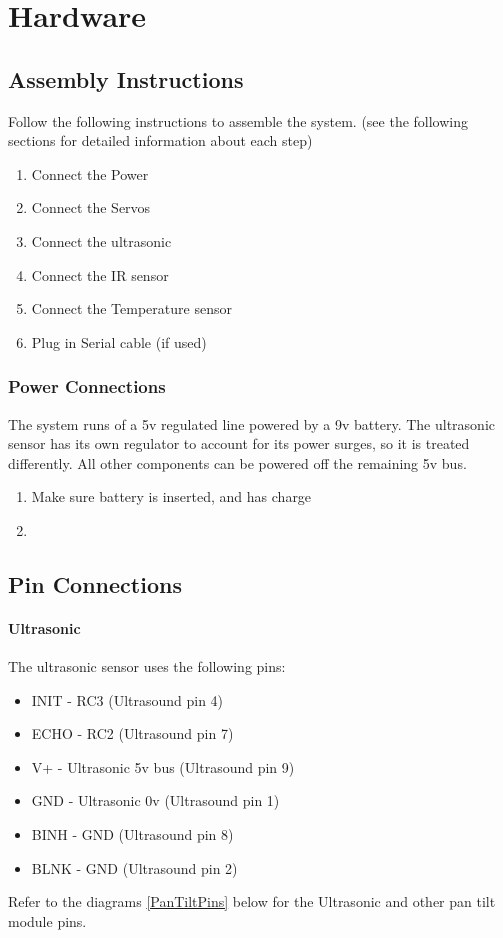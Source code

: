 \documentclass[]{report}
\begin{document}
\part{Hardware}
\chapter{Assembly Instructions}
Follow the following instructions to assemble the system. (see the following sections for detailed information about each step)

\begin{enumerate}
	\item Connect the Power
	\item Connect the Servos
	\item Connect the ultrasonic
	\item Connect the IR sensor
	\item Connect the Temperature sensor
	\item Plug in Serial cable (if used)
\end{enumerate}

\section{Power Connections}
The system runs of a 5v regulated line powered by a 9v battery. The ultrasonic sensor has its own regulator to account for its power surges, so it is treated differently. All other components can be powered off the remaining 5v bus.

\begin{enumerate}
	\item Make sure battery is inserted, and has charge
	\item 
\end{enumerate}

\chapter{Pin Connections}
\subsection{Ultrasonic}
The ultrasonic sensor uses the following pins: 
\begin{itemize}
	\item INIT - RC3 (Ultrasound pin 4)
	\item ECHO - RC2 (Ultrasound pin 7)
	\item V+ - Ultrasonic 5v bus  (Ultrasound pin 9)
	\item GND - Ultrasonic 0v (Ultrasound pin 1)
	\item BINH - GND (Ultrasound pin 8)
	\item BLNK - GND (Ultrasound pin 2)
\end{itemize}
Refer to the diagrams \ref{PanTiltPins} below for the Ultrasonic and other pan tilt module pins.
\end{document}
